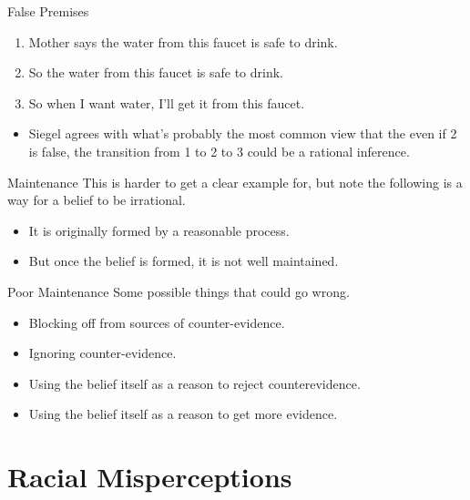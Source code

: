 \documentclass[
  17pt,
  letterpaper,
  ignorenonframetext,
  aspectratio=169,
  handout,
  xcolor={dvipsnames}]{beamer}
\providecommand{\tightlist}{%
  \setlength{\itemsep}{0pt}\setlength{\parskip}{0pt}}\usepackage{longtable,booktabs,array}
\begin{document}
\begin{frame}{False Premises}
\protect\hypertarget{false-premises}{}
\begin{enumerate}[<+->]
\tightlist
\item
  Mother says the water from this faucet is safe to drink.
\item
  So the water from this faucet is safe to drink.
\item
  So when I want water, I'll get it from this faucet.
\end{enumerate}

\begin{itemize}[<+->]
\tightlist
\item
  Siegel agrees with what's probably the most common view that the even
  if 2 is false, the transition from 1 to 2 to 3 could be a rational
  inference.
\end{itemize}
\end{frame}

\begin{frame}{Maintenance}
\protect\hypertarget{maintenance}{}
This is harder to get a clear example for, but note the following is a
way for a belief to be irrational.

\begin{itemize}[<+->]
\tightlist
\item
  It is originally formed by a reasonable process.
\item
  But once the belief is formed, it is not well maintained.
\end{itemize}
\end{frame}

\begin{frame}{Poor Maintenance}
\protect\hypertarget{poor-maintenance}{}
Some possible things that could go wrong.

\begin{itemize}[<+->]
\tightlist
\item
  Blocking off from sources of counter-evidence.
\item
  Ignoring counter-evidence.
\item
  Using the belief itself as a reason to reject counterevidence.
\item
  Using the belief itself as a reason to get more evidence.
\end{itemize}
\end{frame}

\hypertarget{racial-misperceptions}{%
\section{Racial Misperceptions}\label{racial-misperceptions}}
\end{document}
